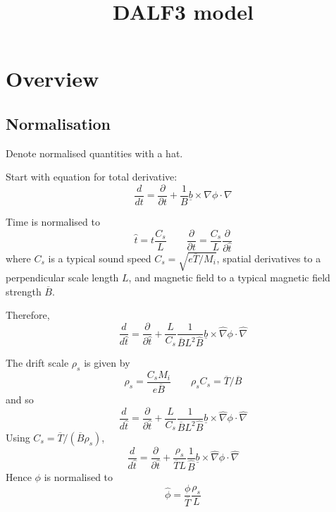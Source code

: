 \documentclass[12pt]{article}
\newcommand{\deriv}[2]{\ensuremath{\frac{\partial #1}{\partial #2}}}
\newcommand{\bvec}{\ensuremath{\underline{b}}}
\begin{document}
\title{DALF3 model}

\maketitle

\section{Overview}


\subsection{Normalisation}

Denote normalised quantities with a hat. 

Start with equation for total derivative:
\[
\frac{d}{dt} = \deriv{}{t} + \frac{1}{B}\bvec\times\nabla \phi \cdot\nabla
\]

Time is normalised to
\[
\hat{t} = t\frac{C_s}{L} \qquad \deriv{}{t} = \frac{C_s}{L}\deriv{}{\hat{t}}
\]
where $C_s$ is a typical sound speed $C_s = \sqrt{e\overline{T}/M_i}$, spatial derivatives to a perpendicular scale length $L$, and magnetic field to a typical magnetic field strength $\overline{B}$.

Therefore,
\[
\frac{d}{d\hat{t}} = \deriv{}{\hat{t}} + \frac{L}{C_s}\frac{1}{\overline{B}L^2\hat{B}}\bvec\times\hat{\nabla} \phi \cdot\hat{\nabla}
\]

The drift scale $\rho_s$ is given by
\[
\rho_s = \frac{C_s M_i}{e\overline{B}} \qquad \rho_sC_s = \overline{T} / \overline{B}
\]
and so
\[
\frac{d}{d\hat{t}} = \deriv{}{\hat{t}} + \frac{L}{C_s}\frac{1}{\overline{B}L^2\hat{B}}\bvec\times\hat{\nabla} \phi \cdot\hat{\nabla}
\]
Using $C_s = \overline{T} / \left(\overline{B}\rho_s\right)$,
\[
\frac{d}{d\hat{t}} = \deriv{}{\hat{t}} + \frac{\rho_s}{\overline{T}L}\frac{1}{\hat{B}}\bvec\times\hat{\nabla} \phi \cdot\hat{\nabla}
\]
Hence $\phi$ is normalised to
\[
\hat{\phi} = \frac{\phi}{\overline{T}}\frac{\rho_s}{L}
\]
\end{document}
